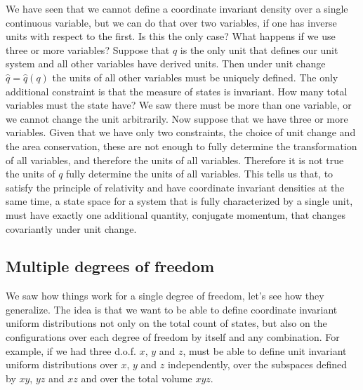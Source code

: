We have seen that we cannot define a coordinate invariant density over a single continuous variable, but we can do that over two variables, if one has inverse units with respect to the first. Is this the only case? What happens if we use three or more variables? Suppose that $q$ is the only unit that defines our unit system and all other variables have derived units. Then under unit change $\hat{q} = \hat{q}(q)$ the units of all other variables must be uniquely defined. The only additional constraint is that the measure of states is invariant. How many total variables must the state have? We saw there must be more than one variable, or we cannot change the unit arbitrarily. Now suppose that we have three or more variables. Given that we have only two constraints, the choice of unit change and the area conservation, these are not enough to fully determine the transformation of all variables, and therefore the units of all variables. Therefore it is not true the units of $q$ fully determine the units of all variables. This tells us that, to satisfy the principle of relativity and have coordinate invariant densities at the same time, a state space for a system that is fully characterized by a single unit, must have exactly one additional quantity, conjugate momentum, that changes covariantly under unit change.

\subsection{Multiple degrees of freedom}

We saw how things work for a single degree of freedom, let's see how they generalize. The idea is that we want to be able to define coordinate invariant uniform distributions not only on the total count of states, but also on the configurations over each degree of freedom by itself and any combination. For example, if we had three d.o.f. $x$, $y$ and $z$, must be able to define unit invariant uniform distributions over $x$, $y$ and $z$ independently, over the subspaces defined by $xy$, $yz$ and $xz$ and over the total volume $xyz$.


